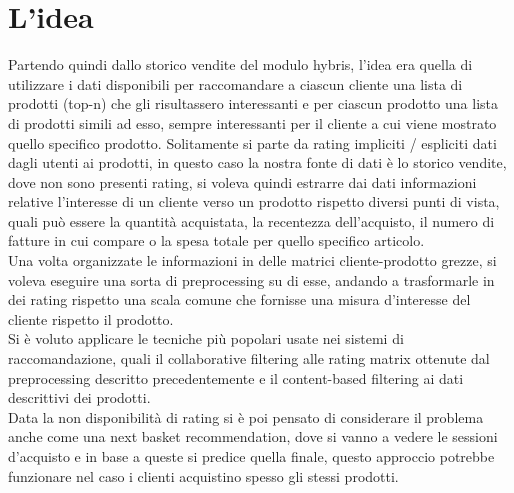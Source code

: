 \section{L'idea}
Partendo quindi dallo storico vendite del modulo hybris, l'idea era quella di utilizzare i dati disponibili per raccomandare a ciascun cliente una lista di prodotti (top-n) che gli risultassero interessanti e per ciascun prodotto una lista di prodotti simili ad esso, sempre interessanti per il cliente a cui viene mostrato quello specifico prodotto.
Solitamente si parte da rating impliciti / espliciti dati dagli utenti ai prodotti, in questo caso la nostra fonte di dati è lo storico vendite, dove non sono presenti rating, si voleva quindi estrarre dai dati informazioni relative l'interesse di un cliente verso un prodotto rispetto diversi punti di vista, quali può essere la quantità acquistata, la recentezza dell'acquisto, il numero di fatture in cui compare o la spesa totale per quello specifico articolo.\\
Una volta organizzate le informazioni in delle matrici cliente-prodotto grezze, si voleva eseguire una sorta di preprocessing su di esse, andando a trasformarle in dei rating rispetto una scala comune che fornisse una misura d'interesse del cliente rispetto il prodotto.\\
Si è voluto applicare le tecniche più popolari usate nei sistemi di raccomandazione, quali il collaborative filtering alle rating matrix ottenute dal preprocessing descritto precedentemente e il content-based filtering ai dati descrittivi dei prodotti.\\
Data la non disponibilità di rating si è poi pensato di considerare il problema anche come una next basket recommendation, dove si vanno a vedere le sessioni d'acquisto e in base a queste si predice quella finale, questo approccio potrebbe funzionare nel caso i clienti acquistino spesso gli stessi prodotti. 

